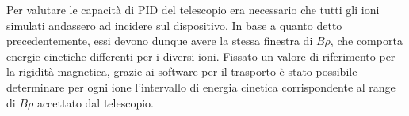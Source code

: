 Per valutare le capacità di PID del telescopio era necessario che tutti gli ioni simulati andassero ad incidere sul dispositivo. 
In base a quanto detto precedentemente, essi devono dunque avere la stessa finestra di $B \rho$, che comporta energie cinetiche differenti per i diversi ioni. 
Fissato un valore di riferimento per la rigidità magnetica, grazie ai software per il trasporto è stato possibile determinare per ogni ione l'intervallo di energia cinetica corrispondente al range di $B \rho$ accettato dal telescopio.









